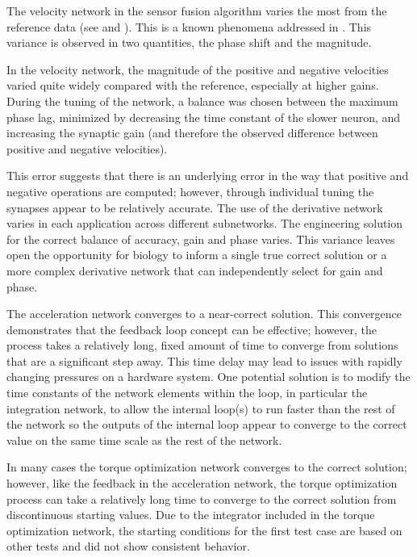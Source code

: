 
The velocity network in the sensor fusion algorithm varies the most from the
reference data (see  and ). This is a known phenomena addressed in
\cite{NickFunctionalSubnetwork}. This variance is observed in two quantities,
the phase shift and the magnitude.

In the velocity network, the magnitude of the positive and negative
velocities varied quite widely compared with the reference, especially at
higher gains. During the tuning of the network, a balance was chosen between
the maximum phase lag, minimized by decreasing the time constant of the slower
neuron, and increasing the synaptic gain (and therefore the observed difference between
positive and negative velocities).

This error suggests that there is an underlying error in the way that positive
and negative operations are computed; however, through individual tuning the
synapses appear to be relatively accurate. The use of the derivative network
varies in each application across different subnetworks. The engineering
solution for the correct balance of accuracy, gain and phase varies. This
variance leaves open the opportunity for biology to inform a single true correct
solution or a more complex derivative network that can independently select for
gain and phase.


The acceleration network converges to a near-correct solution.
This convergence demonstrates that the feedback loop concept can be effective; however, the process takes a relatively long, fixed amount of time to
converge from solutions that are a significant step away. This time delay may lead to
issues with rapidly changing pressures on a hardware system. One potential
solution is to modify the time constants of the network
elements within the loop, in particular the integration network, to allow the
internal loop(s) to run faster than the rest of the network
so the outputs of the internal loop appear to converge to the correct value on the same time scale as the
rest of the network.



In many cases the torque optimization network converges to the
correct solution; however, like the feedback in the acceleration network, the torque optimization process can
take a relatively long time to converge to the correct solution from discontinuous starting
values. Due to the integrator included in the torque optimization network, the starting conditions
for the first test case are based on other tests and did not show consistent
behavior.

